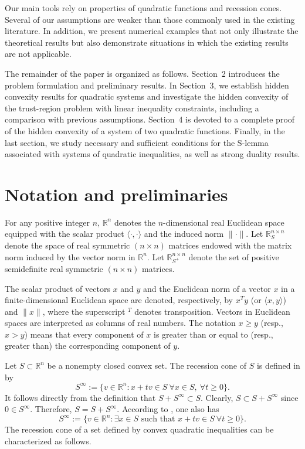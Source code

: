 \documentclass[]{interact}
\theoremstyle{plain}%
\theoremstyle{definition}
\theoremstyle{remark}
\begin{document}
	Our main tools rely on properties of quadratic functions and recession cones.
	Several of our assumptions are weaker than those commonly used in the existing literature.
	In addition, we present numerical examples that not only illustrate the theoretical results
	but also demonstrate situations in which the existing results are not applicable.
	
	The remainder of the paper is organized as follows.
	Section~2 introduces the problem formulation and preliminary results.
	In Section~3, we establish hidden convexity results for quadratic systems
	and investigate the hidden convexity of the trust-region problem with linear inequality constraints,
	including a comparison with previous assumptions.
	Section~4 is devoted to a complete proof of the hidden convexity of a system of two quadratic functions.
	Finally, in the last section, we study necessary and sufficient conditions for the S-lemma
	associated with systems of quadratic inequalities, as well as strong duality results.
	
	
	
	
	\section{ Notation and preliminaries} 
	
	For any positive integer $n$, $\mathbb{R}^n$ denotes the $n$-dimensional real Euclidean space
	equipped with the scalar product $\langle \cdot,\cdot \rangle$ and the induced norm $\|\cdot\|$.
	Let $\mathbb{R}^{n\times n}_{S}$ denote the space of real symmetric $(n\times n)$ matrices
	endowed with the matrix norm induced by the vector norm in $\mathbb{R}^n$.
	Let $\mathbb{R}^{n \times n}_{S^{+}}$
	denote the set of positive semidefinite real symmetric $(n\times n)$ matrices.
	
	The scalar product of vectors $x$ and $y$ and the Euclidean norm of a vector $x$
	in a finite-dimensional Euclidean space are denoted, respectively, by $x^T y$
	(or $\langle x,y\rangle$) and $\|x\|$, where the superscript $^T$ denotes transposition.
	Vectors in Euclidean spaces are interpreted as columns of real numbers.
	The notation $x \ge y$ (resp., $x > y$) means that every component of $x$
	is greater than or equal to (resp., greater than) the corresponding component of $y$.
	
	
	
	
	Let $S\subset \mathbb{R}^n$ be a nonempty closed convex set.
	The recession cone of $S$ is defined in \cite[p.~61]{Rockafellar1970} by
	$$
	S^\infty:=\{v\in \mathbb{R}^n : x+tv\in S \ \forall x\in S,\ \forall t\geq 0\}.
	$$
	It follows directly from the definition that $S+S^\infty\subset S$.
	Clearly, $S\subset S+S^\infty$ since $0\in S^\infty$.
	Therefore, $S=S+S^\infty$.
	According to \cite[Theorem~8.3]{Rockafellar1970}, one also has
	$$
	S^\infty:=\{v\in \mathbb{R}^n : \exists x\in S \text{ such that } x+tv\in S \ \forall t\geq 0\}.
	$$
	The recession cone of a set defined by convex quadratic inequalities can be characterized as follows.
	
\end{document}
